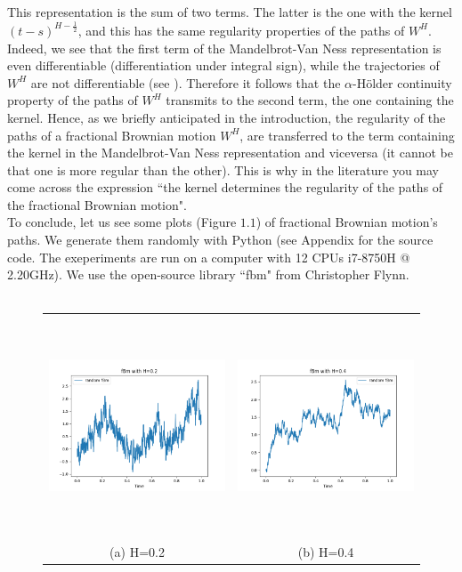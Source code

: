 \documentclass[a4paper,italian,11pt]{book}
\theoremstyle{plain}
\theoremstyle{remark}
\theoremstyle{plain}
\begin{document}
This representation is the sum of two terms. The latter is the one with the kernel $(t-s)^{H-\frac{1}{2}}$, and this has the same regularity properties of the paths of $W^H$. 
Indeed, we see that the first term of the Mandelbrot-Van Ness representation is even differentiable (differentiation under integral sign), while the trajectories of $W^H$ are not differentiable (see \cite{ZhangBook}). 
Therefore it follows that the $\alpha$-Hölder continuity property of the paths of $W^H$ transmits to the second term, the one containing the kernel.
Hence, as we briefly anticipated in the introduction, the regularity of the paths of a fractional Brownian motion $W^H$, are transferred to the term containing the kernel in the Mandelbrot-Van Ness representation and viceversa (it cannot be that one is more regular than the other). 
This is why in the literature you may come across the expression ``the kernel determines the regularity of the paths of the fractional Brownian motion". 
\\

To conclude, let us see some plots (Figure $1.1$) of fractional Brownian motion's paths. We generate them randomly with Python (see Appendix for the source code. The exeperiments are run on a computer with 12 CPUs i7-8750H  @ 2.20GHz).
We use the open-source library ``fbm" from Christopher Flynn. 
\\
\\

\begin{figure}[hb]
\begin{tabular}{cc}
  \includegraphics[width=65mm, height=65mm]{fBm_pictures/02.png} &   
  \includegraphics[width=65mm, height=65mm]{fBm_pictures/04.png} \\
(a) H=0.2 & (b) H=0.4 \\[6pt]

\end{tabular}
\end{figure}
\end{document}

